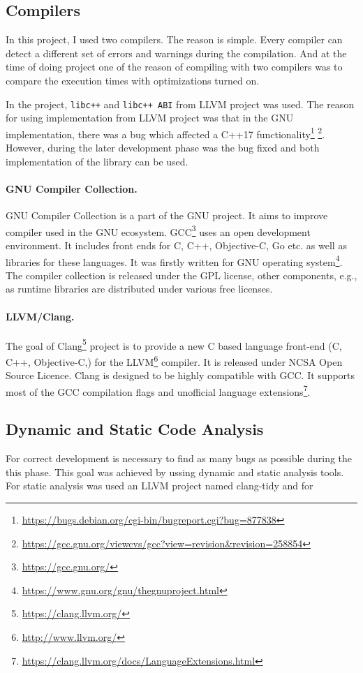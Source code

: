 \subsection{Compilers}
\label{subsec:compilers}
In this project, I used two compilers. The reason is simple.
Every compiler can detect a different set of errors and warnings during the compilation.
And at the time of doing project one of the reason of compiling with two compilers
was to compare the execution times with optimizations turned on.

In the project, \texttt{libc++} and \texttt{libc++ ABI} from LLVM project was
used. The reason for using implementation from LLVM project was that in the GNU
implementation, there was a bug which affected a C++17
functionality\footnote{\url{https://bugs.debian.org/cgi-bin/bugreport.cgi?bug=877838}}
\footnote{\url{https://gcc.gnu.org/viewcvs/gcc?view=revision&revision=258854}}.
However, during the later development phase was the bug fixed and both implementation
of the library can be used.

\paragraph{GNU Compiler Collection.}GNU Compiler Collection is a part of the GNU project.
It aims to improve compiler used in the GNU ecosystem.
GCC\footnote{\url{https://gcc.gnu.org/}} uses an open development environment.
It includes front ends for C, C++, Objective-C, Go etc.
as well as libraries for these languages. It was firstly written for GNU operating system\footnote{\url{https://www.gnu.org/gnu/thegnuproject.html}}.
The compiler collection is released under the GPL license, other components, e.g., as runtime libraries are distributed under various free licenses.

\paragraph{LLVM/Clang.}
The goal of Clang\footnote{\url{https://clang.llvm.org/}} project is to provide a new C based language front-end (C, C++, Objective-C,) for the LLVM\footnote{\url{http://www.llvm.org/}} compiler.
It is released under NCSA Open Source Licence. Clang is designed to be highly compatible with GCC.
It supports most of the GCC compilation flags and unofficial language extensions\footnote{\url{https://clang.llvm.org/docs/LanguageExtensions.html}}.

\subsection{Dynamic and Static Code Analysis}
For correct development is necessary to find as many bugs as possible during the this phase.
This goal was achieved by ussing dynamic and static analysis tools.
For static analysis was used an LLVM project named clang-tidy and for

